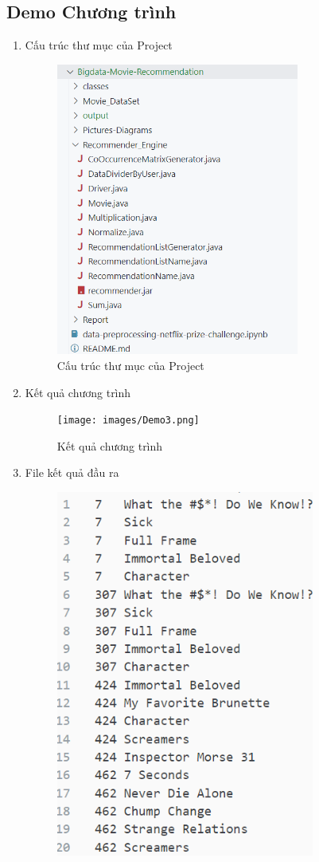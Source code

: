 \subsection*{Demo Chương trình}
\begin{enumerate}
    \item Cấu trúc thư mục của Project
          \begin{figure}[ht]
              \centering
              \includegraphics[width=8cm]{images/Demo2.png}
              \caption{Cấu trúc thư mục của Project}
          \end{figure}
          \pagebreak
    \item Kết quả chương trình
          \begin{figure}[ht]
              \centering
              \texttt{[image: images/Demo3.png]}
              \caption{Kết quả chương trình}
          \end{figure}
    \item File kết quả đầu ra
          \begin{figure}[ht]
              \centering
              \includegraphics[width=8.5cm]{images/Demo4.png}

\end{figure}
\end{enumerate}
